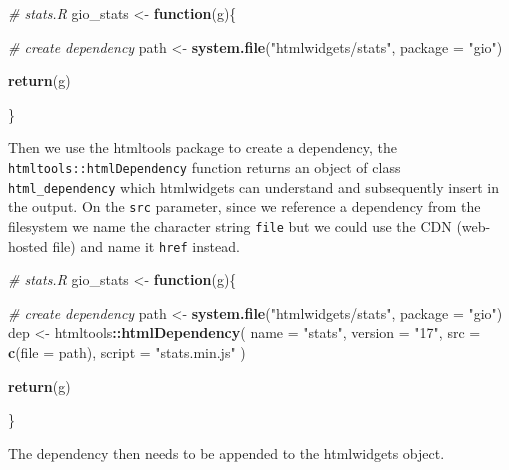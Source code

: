 \documentclass[
]{krantz}
\makeatletter
\newenvironment{Shaded}{\begin{snugshade}}{\end{snugshade}}
\newcommand{\CommentTok}[1]{\textcolor[rgb]{0.37,0.37,0.37}{\textit{#1}}}
\newcommand{\ControlFlowTok}[1]{\textcolor[rgb]{0.27,0.27,0.27}{\textbf{#1}}}
\newcommand{\DataTypeTok}[1]{\textcolor[rgb]{0.27,0.27,0.27}{#1}}
\newcommand{\KeywordTok}[1]{\textcolor[rgb]{0.27,0.27,0.27}{\textbf{#1}}}
\newcommand{\NormalTok}[1]{#1}
\newcommand{\OperatorTok}[1]{\textcolor[rgb]{0.43,0.43,0.43}{\textbf{#1}}}
\newcommand{\StringTok}[1]{\textcolor[rgb]{0.5,0.5,0.5}{#1}}
\newenvironment{kframe}{%
\medskip{}
\setlength{\fboxsep}{.8em}
 \def\at@end@of@kframe{}%
 \ifinner\ifhmode%
  \def\at@end@of@kframe{\end{minipage}}%
  \begin{minipage}{\columnwidth}%
 \fi\fi%
 \def\FrameCommand##1{\hskip\@totalleftmargin \hskip-\fboxsep
 \colorbox{shadecolor}{##1}\hskip-\fboxsep
     \hskip-\linewidth \hskip-\@totalleftmargin \hskip\columnwidth}%
 \MakeFramed {\advance\hsize-\width
   \@totalleftmargin\z@ \linewidth\hsize
   \@setminipage}}%
 {\par\unskip\endMakeFramed%
 \at@end@of@kframe}
\renewenvironment{Shaded}{\begin{kframe}}{\end{kframe}}
\makeatother
\begin{document}
\begin{Shaded}
\begin{Highlighting}[]
\CommentTok{\# stats.R}
\NormalTok{gio\_stats <{-}}\StringTok{ }\ControlFlowTok{function}\NormalTok{(g)\{}

  \CommentTok{\# create dependency}
\NormalTok{  path <{-}}\StringTok{ }\KeywordTok{system.file}\NormalTok{(}\StringTok{"htmlwidgets/stats"}\NormalTok{, }\DataTypeTok{package =} \StringTok{"gio"}\NormalTok{)}

  \KeywordTok{return}\NormalTok{(g)}

\NormalTok{\}}
\end{Highlighting}
\end{Shaded}

Then we use the htmltools package to create a dependency, the \texttt{htmltools::htmlDependency} function returns an object of class \texttt{html\_dependency} which htmlwidgets can understand and subsequently insert in the output. On the \texttt{src} parameter, since we reference a dependency from the filesystem we name the character string \texttt{file} but we could use the CDN (web-hosted file) and name it \texttt{href} instead.

\begin{Shaded}
\begin{Highlighting}[]
\CommentTok{\# stats.R}
\NormalTok{gio\_stats <{-}}\StringTok{ }\ControlFlowTok{function}\NormalTok{(g)\{}

  \CommentTok{\# create dependency}
\NormalTok{  path <{-}}\StringTok{ }\KeywordTok{system.file}\NormalTok{(}\StringTok{"htmlwidgets/stats"}\NormalTok{, }\DataTypeTok{package =} \StringTok{"gio"}\NormalTok{)}
\NormalTok{  dep <{-}}\StringTok{ }\NormalTok{htmltools}\OperatorTok{::}\KeywordTok{htmlDependency}\NormalTok{(}
    \DataTypeTok{name =} \StringTok{"stats"}\NormalTok{,}
    \DataTypeTok{version =} \StringTok{"17"}\NormalTok{,}
    \DataTypeTok{src =} \KeywordTok{c}\NormalTok{(}\DataTypeTok{file =}\NormalTok{ path),}
    \DataTypeTok{script =} \StringTok{"stats.min.js"}
\NormalTok{  )}

  \KeywordTok{return}\NormalTok{(g)}

\NormalTok{\}}
\end{Highlighting}
\end{Shaded}

The dependency then needs to be appended to the htmlwidgets object.
\end{document}
